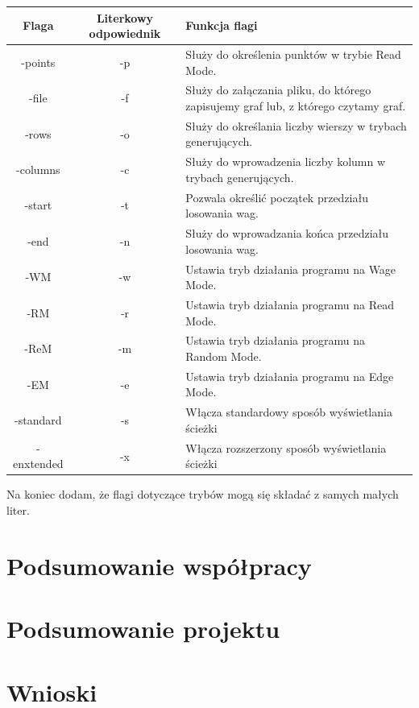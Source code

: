 \documentclass[10pt, a4paper]{report}
\begin{document}
    \begin{tabularx}{\textwidth}{ c|c|X }
        \hline Flaga & Literkowy odpowiednik & Funkcja flagi \\
        \hline -points & -p & Służy do określenia punktów w trybie Read Mode.\\
        \hline -file & -f & Służy do załączania pliku, do którego zapisujemy graf lub, z którego czytamy graf.\\
        \hline -rows & -o & Służy do określania liczby wierszy w trybach generujących.\\
        \hline -columns & -c & Służy do wprowadzenia liczby kolumn w trybach generujących.\\
        \hline -start & -t & Pozwala określić początek przedziału losowania wag.\\
        \hline -end & -n & Służy do wprowadzania końca przedziału losowania wag.\\
        \hline -WM & -w & Ustawia tryb działania programu na Wage Mode.\\
        \hline -RM & -r & Ustawia tryb działania programu na Read Mode.\\
        \hline -ReM & -m & Ustawia tryb działania programu na Random Mode.\\
        \hline -EM & -e & Ustawia tryb działania programu na Edge Mode.\\
        \hline -standard & -s & Włącza standardowy sposób wyświetlania ścieżki\\
        \hline -enxtended & -x & Włącza rozszerzony sposób wyświetlania ścieżki\\
        \hline
    \end{tabularx}
    \newline\newline Na koniec dodam, że flagi dotyczące trybów mogą się składać z samych małych liter.

    \section{Podsumowanie współpracy}

    \section{Podsumowanie projektu}

    \section{Wnioski}
\end{document}

